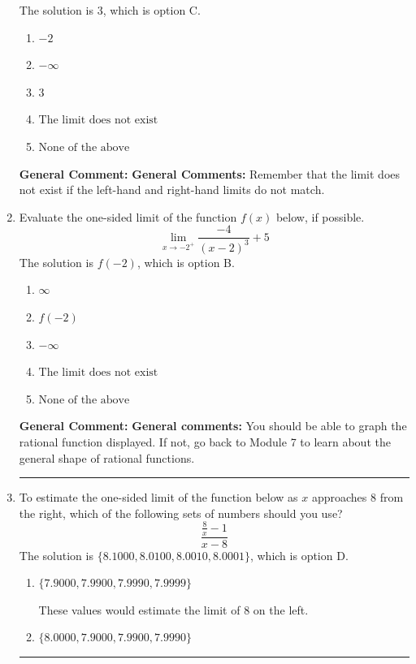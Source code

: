 \documentclass{extbook}[14pt]
\newcommand{\litem}[1]{\item #1

\rule{\textwidth}{0.4pt}}
\begin{document}
\begin{enumerate}
{The solution is \( 3 \), which is option C.\begin{enumerate}[label=\Alph*.]
\item \( -2 \)


\item \( -\infty \)


\item \( 3 \)


\item \( \text{The limit does not exist} \)


\item \( \text{None of the above} \)


\end{enumerate}

\textbf{General Comment:} \textbf{General Comments:} Remember that the limit does not exist if the left-hand and right-hand limits do not match.
}
\litem{
Evaluate the one-sided limit of the function $f(x)$ below, if possible.
\[ \lim_{x \rightarrow -2^+} \frac{-4}{(x-2)^3}+5 \]The solution is \( f(-2) \), which is option B.\begin{enumerate}[label=\Alph*.]
\item \( \infty \)


\item \( f(-2) \)


\item \( -\infty \)


\item \( \text{The limit does not exist} \)


\item \( \text{None of the above} \)


\end{enumerate}

\textbf{General Comment:} \textbf{General comments:} You should be able to graph the rational function displayed. If not, go back to Module 7 to learn about the general shape of rational functions.
}
\litem{
To estimate the one-sided limit of the function below as $x$ approaches 8 from the right, which of the following sets of numbers should you use?
\[ \frac{\frac{8}{x} - 1}{x - 8} \]The solution is \( \{ 8.1000, 8.0100, 8.0010, 8.0001 \} \), which is option D.\begin{enumerate}[label=\Alph*.]
\item \( \{ 7.9000, 7.9900, 7.9990, 7.9999 \} \)

These values would estimate the limit of 8 on the left.
\item \( \{ 8.0000, 7.9000, 7.9900, 7.9990 \} \)


\end{enumerate}}
\end{enumerate}
\end{document}
